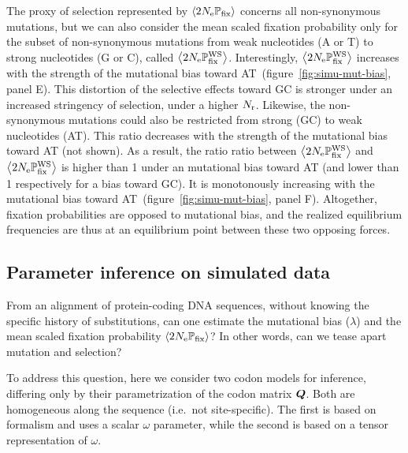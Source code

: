\documentclass{article}
\begin{document}
The proxy of selection represented by $\left\langle 2 N_{\text{e}} \mathbb{P}_{\text{fix}} \right\rangle$ concerns all {non-synonymous} mutations, but we can also consider the mean scaled fixation probability only for the subset of {non-synonymous} mutations from weak nucleotides (A or T) to strong nucleotides (G or C), called $\left\langle 2 N_{\text{e}} \mathbb{P}_{\text{fix}}^{\text{WS}} \right\rangle$.
Interestingly, $\left\langle 2 N_{\text{e}} \mathbb{P}_{\text{fix}}^{\text{WS}} \right\rangle$ increases with the strength of the mutational bias toward AT~(figure~\ref{fig:simu-mut-bias}, panel E).
This distortion of the selective effects toward GC is stronger under an increased stringency of selection, under a higher $N_{\text{r}}$.
Likewise, the {non-synonymous} mutations could also be restricted from strong (GC) to weak nucleotides (AT).
This ratio decreases with the strength of the mutational bias toward AT (not shown).
As a result, the ratio ratio between $\left\langle 2 N_{\text{e}} \mathbb{P}_{\text{fix}}^{\text{WS}} \right\rangle$ and $\left\langle 2 N_{\text{e}} \mathbb{P}_{\text{fix}}^{\text{WS}} \right\rangle$ is higher than 1 under an mutational bias toward AT (and lower than 1 respectively for a bias toward GC).
It is monotonously increasing with the mutational bias toward AT~(figure~\ref{fig:simu-mut-bias}, panel F).
Altogether, fixation probabilities are opposed to mutational bias, and the realized equilibrium frequencies are thus at an equilibrium point between these two opposing forces.

\subsection{Parameter inference on simulated data}
\label{subsec:parameter-inference-on-simulated-data}

From an alignment of protein-coding {DNA} sequences, without knowing the specific history of {substitutions}, can one estimate the mutational bias ($\lambda$) and the mean scaled fixation probability $\left\langle 2 N_{\text{e}} \mathbb{P}_{\text{fix}} \right\rangle$?
In other words, can we tease apart mutation and selection?

To address this question, here we consider two codon models for inference, differing only by their parametrization of the codon matrix $\bm{Q}$.
Both are homogeneous along the sequence (i.e.~not site-specific).
The first is based on \citet{Muse1994} formalism and uses a scalar $\omega$ parameter, while the second is based on a tensor representation of $\omega$.
\end{document}
